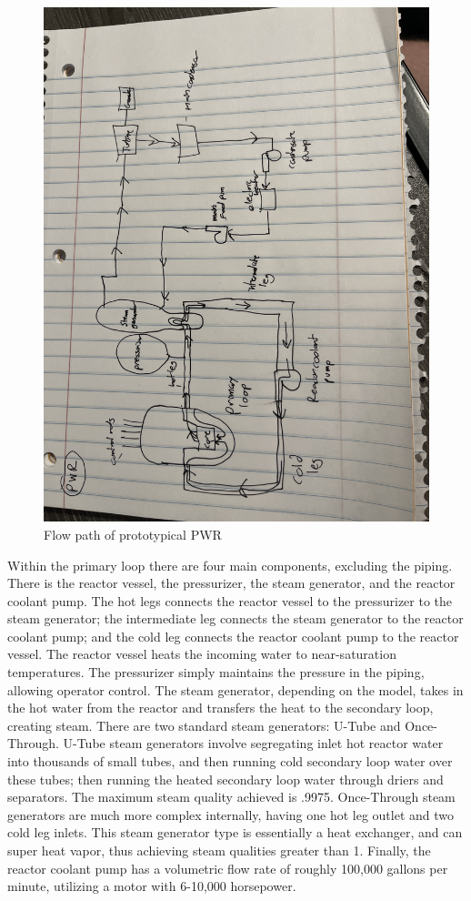 \documentclass{article}
\begin{document}
\begin{figure}[!h!]
    \centering
    \includegraphics[width=0.9\linewidth,angle=180]{hw3PWR.JPG}
    \caption{Flow path of prototypical PWR}
    \label{fig:pwr}
\end{figure}

\newpage
Within the primary loop there are four main components, excluding the piping. There is the reactor vessel, the pressurizer, the steam generator, and the reactor coolant pump. The hot legs connects the reactor vessel to the pressurizer to the steam generator; the intermediate leg connects the steam generator to the reactor coolant pump; and the cold leg connects the reactor coolant pump to the reactor vessel. The reactor vessel heats the incoming water to near-saturation temperatures. The pressurizer simply maintains the pressure in the piping, allowing operator control. The steam generator, depending on the model, takes in the hot water from the reactor and transfers the heat to the secondary loop, creating steam. There are two standard steam generators: U-Tube and Once-Through. U-Tube steam generators involve segregating inlet hot reactor water into thousands of small tubes, and then running cold secondary loop water over these tubes; then running the heated secondary loop water through driers and separators. The maximum steam quality achieved is .9975. Once-Through steam generators are much more complex internally, having one hot leg outlet and two cold leg inlets. This steam generator type is essentially a heat exchanger, and can super heat vapor, thus achieving steam qualities greater than 1. Finally, the reactor coolant pump has a volumetric flow rate of roughly 100,000 gallons per minute, utilizing a motor with 6-10,000 horsepower. 
\end{document}

